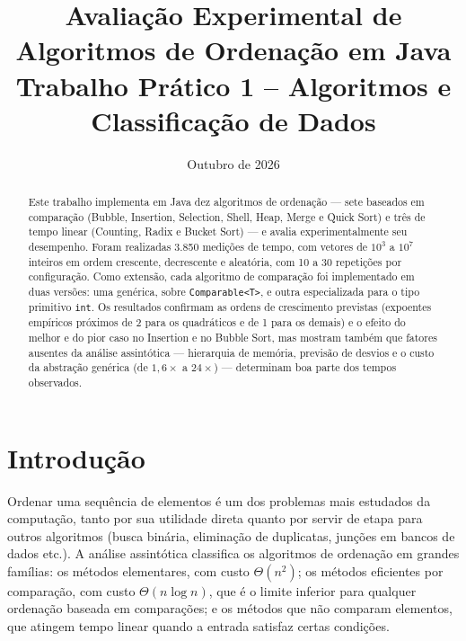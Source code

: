 \documentclass[11pt,a4paper]{article}
\title{\textbf{Avaliação Experimental de Algoritmos de Ordenação em Java}\\[4pt]
\large Trabalho Prático 1 -- Algoritmos e Classificação de Dados}
\author{\autores}
\date{Outubro de 2026}
\begin{document}
\maketitle

\begin{abstract}
Este trabalho implementa em Java dez algoritmos de ordenação --- sete baseados em comparação
(Bubble, Insertion, Selection, Shell, Heap, Merge e Quick Sort) e três de tempo linear
(Counting, Radix e Bucket Sort) --- e avalia experimentalmente seu desempenho. Foram realizadas
3.850 medições de tempo, com vetores de $10^3$ a $10^7$ inteiros em ordem crescente, decrescente e
aleatória, com 10 a 30 repetições por configuração. Como extensão, cada algoritmo de comparação foi
implementado em duas versões: uma genérica, sobre \texttt{Comparable<T>}, e outra especializada para
o tipo primitivo \texttt{int}. Os resultados confirmam as ordens de crescimento previstas
(expoentes empíricos próximos de 2 para os quadráticos e de 1 para os demais) e o efeito do
melhor e do pior caso no Insertion e no Bubble Sort, mas mostram também que fatores ausentes da
análise assintótica --- hierarquia de memória, previsão de desvios e o custo da abstração genérica
(de $1{,}6\times$ a $24\times$) --- determinam boa parte dos tempos observados.
\end{abstract}

\section{Introdução}

Ordenar uma sequência de elementos é um dos problemas mais estudados da computação, tanto por sua
utilidade direta quanto por servir de etapa para outros algoritmos (busca binária, eliminação de
duplicatas, junções em bancos de dados etc.). A análise assintótica classifica os algoritmos de
ordenação em grandes famílias: os métodos elementares, com custo $\Theta(n^2)$; os métodos
eficientes por comparação, com custo $\Theta(n \log n)$, que é o limite inferior para qualquer
ordenação baseada em comparações; e os métodos que não comparam elementos, que atingem tempo linear
quando a entrada satisfaz certas condições.
\end{document}
